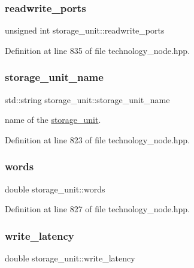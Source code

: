 \subsubsection{\texorpdfstring{readwrite\+\_\+ports}{readwrite\_ports}}
{\footnotesize\ttfamily unsigned int storage\+\_\+unit\+::readwrite\+\_\+ports}



Definition at line 835 of file technology\+\_\+node.\+hpp.

\mbox{\label{structstorage__unit_a6a4d753ad72a7879c6a3b66742daeb18}} 
\subsubsection{\texorpdfstring{storage\+\_\+unit\+\_\+name}{storage\_unit\_name}}
{\footnotesize\ttfamily std\+::string storage\+\_\+unit\+::storage\+\_\+unit\+\_\+name}



name of the \hyperlink{structstorage__unit}{storage\+\_\+unit}. 



Definition at line 823 of file technology\+\_\+node.\+hpp.

\mbox{\label{structstorage__unit_a3c99b278e1f51cc7ba7b4d4360a7d00c}} 
\subsubsection{\texorpdfstring{words}{words}}
{\footnotesize\ttfamily double storage\+\_\+unit\+::words}



Definition at line 827 of file technology\+\_\+node.\+hpp.

\mbox{\label{structstorage__unit_ac9ff4d36f23e54364642b0f0c22c752e}} 
\subsubsection{\texorpdfstring{write\+\_\+latency}{write\_latency}}
{\footnotesize\ttfamily double storage\+\_\+unit\+::write\+\_\+latency}



